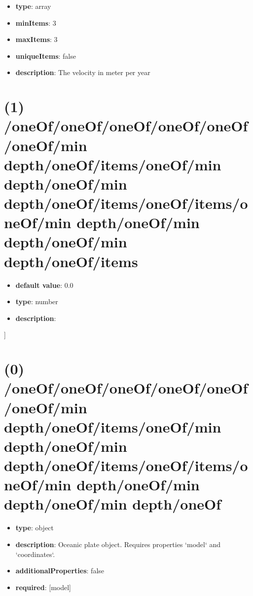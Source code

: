 \begin{itemize}[leftmargin=0em]\item {\bf type}: array
\item {\bf minItems}: 3
\item {\bf maxItems}: 3
\item {\bf uniqueItems}: false
\item {\bf description}: The velocity in meter per year
\end{itemize}\section{(1) /oneOf/oneOf/oneOf/oneOf/oneOf/oneOf/min depth/oneOf/items/oneOf/min depth/oneOf/min depth/oneOf/items/oneOf/items/oneOf/min depth/oneOf/min depth/oneOf/min depth/oneOf/items}
\begin{itemize}[leftmargin=1em]\item {\bf default value}: 0.0
\item {\bf type}: number
\item {\bf description}: 
\end{itemize}]\section{(0) /oneOf/oneOf/oneOf/oneOf/oneOf/oneOf/min depth/oneOf/items/oneOf/min depth/oneOf/min depth/oneOf/items/oneOf/items/oneOf/min depth/oneOf/min depth/oneOf/min depth/oneOf}
\begin{itemize}[leftmargin=0em]\item {\bf type}: object
\item {\bf description}: Oceanic plate object. Requires properties `model` and `coordinates`.
\item {\bf additionalProperties}: false
\item {\bf required}: [model]\end{itemize}

